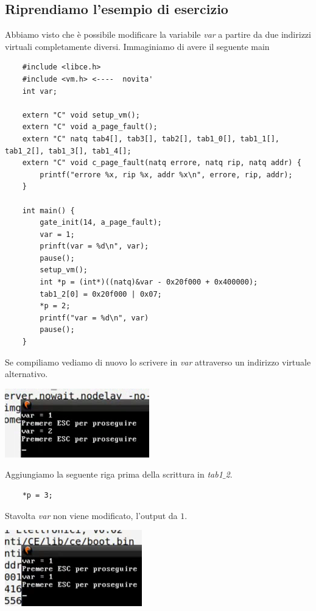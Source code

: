 \subsection{Riprendiamo l'esempio di esercizio} Abbiamo visto che è possibile modificare la variabile \emph{var} a partire da due indirizzi virtuali completamente diversi. Immaginiamo di avere il seguente main
\begin{verbatim}
	#include <libce.h>
	#include <vm.h> <----  novita'
	int var;
	
	extern "C" void setup_vm();
	extern "C" void a_page_fault();
	extern "C" natq tab4[], tab3[], tab2[], tab1_0[], tab1_1[], tab1_2[], tab1_3[], tab1_4[];
	extern "C" void c_page_fault(natq errore, natq rip, natq addr) {
		printf("errore %x, rip %x, addr %x\n", errore, rip, addr);
	}
	
	int main() {
		gate_init(14, a_page_fault);
		var = 1;
		prinft(var = %d\n", var);
		pause();
		setup_vm();
		int *p = (int*)((natq)&var - 0x20f000 + 0x400000);
		tab1_2[0] = 0x20f000 | 0x07;
		*p = 2;
		printf("var = %d\n", var)
		pause();
	}
\end{verbatim}
Se compiliamo vediamo di nuovo lo scrivere in \emph{var} attraverso un indirizzo virtuale alternativo. 
\begin{center}
	\includegraphics{img/233.PNG}
\end{center}
Aggiungiamo la seguente riga prima della scrittura in \emph{tab1$\_$2}.
\begin{verbatim}
	*p = 3;
\end{verbatim}
Stavolta \emph{var} non viene modificato, l'output da $1$.
\begin{center}
	\includegraphics{img/234.PNG}
\end{center}
